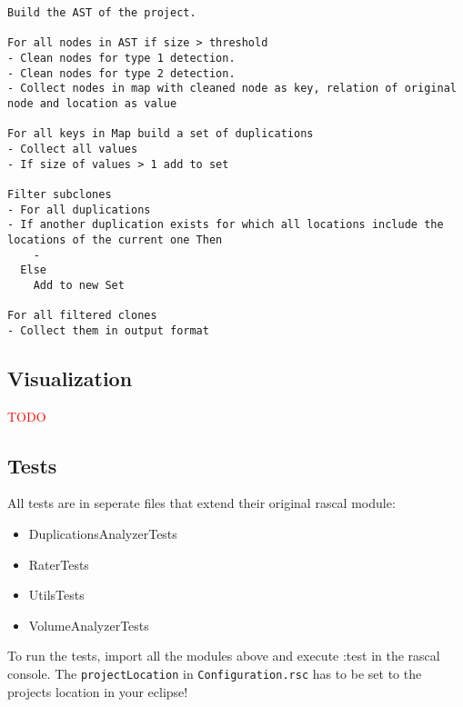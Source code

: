 \documentclass{uva-inf-article}
\newcommand\todo[1]{\textcolor{red}{#1}}
\begin{document}
\begin{verbatim}
Build the AST of the project.

For all nodes in AST if size > threshold
- Clean nodes for type 1 detection.
- Clean nodes for type 2 detection.
- Collect nodes in map with cleaned node as key, relation of original node and location as value

For all keys in Map build a set of duplications
- Collect all values
- If size of values > 1 add to set

Filter subclones
- For all duplications
- If another duplication exists for which all locations include the locations of the current one Then
    -
  Else
    Add to new Set
    
For all filtered clones
- Collect them in output format
\end{verbatim}


\subsection{Visualization}

\todo{TODO}


\subsection{Tests}

All tests are in seperate files that extend their original rascal
module:

\begin{itemize}

\item
  DuplicationsAnalyzerTests
\item
  RaterTests
\item
  UtilsTests
\item
  VolumeAnalyzerTests
\end{itemize}

To run the tests, import all the modules above and execute :test in the
rascal console. The \texttt{projectLocation} in
\texttt{Configuration.rsc} has to be set to the projects location in
your eclipse!



\printbibliography


\end{document}
